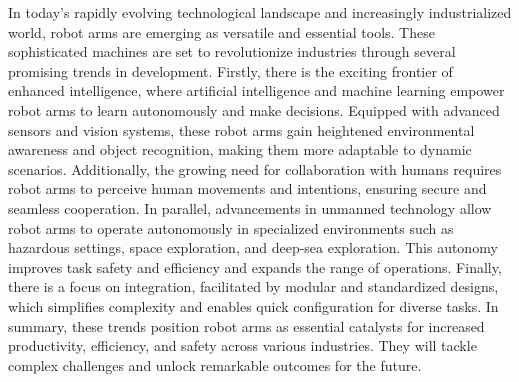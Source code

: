In today's rapidly evolving technological landscape and increasingly industrialized world, robot arms are emerging as versatile and essential tools. These sophisticated machines are set to revolutionize industries through several promising trends in development.
Firstly, there is the exciting frontier of enhanced intelligence, where artificial intelligence and machine learning empower robot arms to learn autonomously and make decisions. Equipped with advanced sensors and vision systems, these robot arms gain heightened environmental awareness and object recognition, making them more adaptable to dynamic scenarios. Additionally, the growing need for collaboration with humans requires robot arms to perceive human movements and intentions, ensuring secure and seamless cooperation. In parallel, advancements in unmanned technology allow robot arms to operate autonomously in specialized environments such as hazardous settings, space exploration, and deep-sea exploration. This autonomy improves task safety and efficiency and expands the range of operations. Finally, there is a focus on integration, facilitated by modular and standardized designs, which simplifies complexity and enables quick configuration for diverse tasks. In summary, these trends position robot arms as essential catalysts for increased productivity, efficiency, and safety across various industries. They will tackle complex challenges and unlock remarkable outcomes for the future.